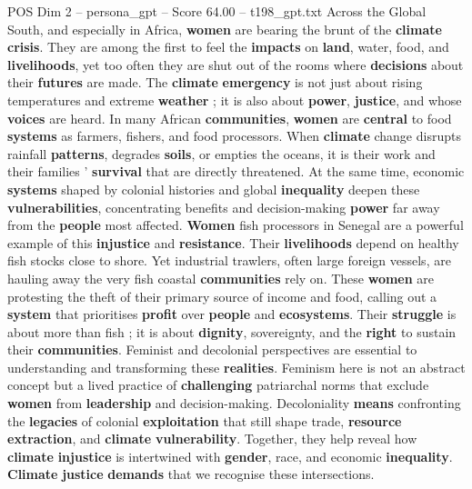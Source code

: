 \begin{textsample}{POS Dim 2 – persona\_gpt – Score 64.00 – t198\_gpt.txt}  \label{ex:f2_pos_006}
Across the Global South, and especially in Africa, \textbf{women} are bearing the brunt of the \textbf{climate} \textbf{crisis}.
They are among the first to feel the \textbf{impacts} on \textbf{land}, water, food, and \textbf{livelihoods}, yet too often they are shut out of the rooms where \textbf{decisions} about their \textbf{futures} are made.
The \textbf{climate} \textbf{emergency} is not just about rising temperatures and extreme \textbf{weather} ; it is also about \textbf{power}, \textbf{justice}, and whose \textbf{voices} are heard.
In many African \textbf{communities}, \textbf{women} are \textbf{central} to food \textbf{systems} as farmers, fishers, and food processors.
When \textbf{climate} change disrupts rainfall \textbf{patterns}, degrades \textbf{soils}, or empties the oceans, it is their work and their families ’ \textbf{survival} that are directly threatened.
At the same time, economic \textbf{systems} shaped by colonial histories and global \textbf{inequality} deepen these \textbf{vulnerabilities}, concentrating benefits and decision-making \textbf{power} far away from the \textbf{people} most affected. \textbf{Women} fish processors in Senegal are a powerful example of this \textbf{injustice} and \textbf{resistance}.
Their \textbf{livelihoods} depend on healthy fish stocks close to shore.
Yet industrial trawlers, often large foreign vessels, are hauling away the very fish coastal \textbf{communities} rely on.
These \textbf{women} are protesting the theft of their primary source of income and food, calling out a \textbf{system} that prioritises \textbf{profit} over \textbf{people} and \textbf{ecosystems}.
Their \textbf{struggle} is about more than fish ; it is about \textbf{dignity}, sovereignty, and the \textbf{right} to sustain their \textbf{communities}.
Feminist and decolonial perspectives are essential to understanding and transforming these \textbf{realities}.
Feminism here is not an abstract concept but a lived practice of \textbf{challenging} patriarchal norms that exclude \textbf{women} from \textbf{leadership} and decision-making.
Decoloniality \textbf{means} confronting the \textbf{legacies} of colonial \textbf{exploitation} that still shape trade, \textbf{resource} \textbf{extraction}, and \textbf{climate} \textbf{vulnerability}.
Together, they help reveal how \textbf{climate} \textbf{injustice} is intertwined with \textbf{gender}, race, and economic \textbf{inequality}. \textbf{Climate} \textbf{justice} \textbf{demands} that we recognise these intersections.

\end{textsample}
